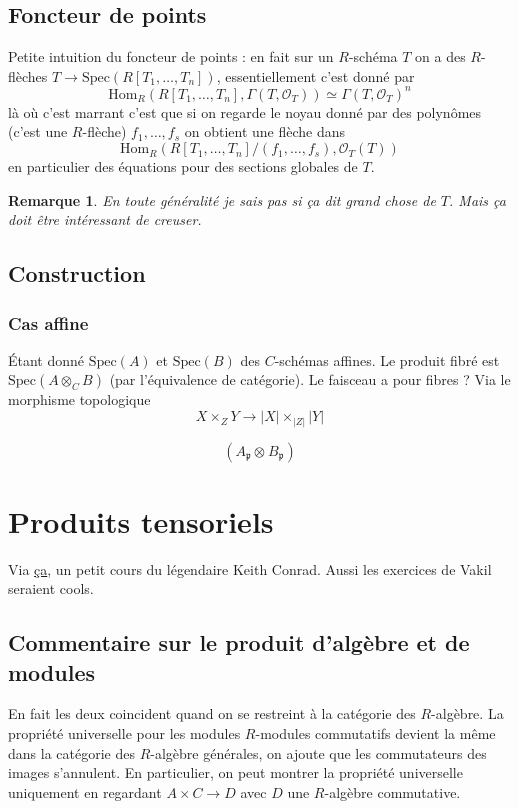\documentclass[a4paper,12pt]{book}
\newcommand{\Or}{\mathcal{O}}
\newcommand{\Hom}{\textrm{Hom}}
\newcommand{\Spec}{\textrm{Spec}}
\newcommand{\p}{\mathfrak{p}}
\newcommand{\q}{\mathfrak{p}}
\theoremstyle{plain}
\newtheorem{rem}{Remarque}
\theoremstyle{definition}
\theoremstyle{remark}
\begin{document}
\section{Foncteur de points}
Petite intuition du foncteur de points : en fait sur un $R$-schéma $T$
on a des $R$-flèches $T\to \Spec(R[T_1,\ldots,T_n])$, essentiellement 
c'est donné par 
\[\Hom_R(R[T_1,\ldots,T_n],\Gamma(T,\Or_T))\simeq \Gamma(T,\Or_T)^n\]
là où c'est marrant c'est que si on regarde le noyau donné par des 
polynômes (c'est une $R$-flèche) $f_1,\ldots, f_s$ on obtient une 
flèche dans 
\[\Hom_R(R[T_1,\ldots, T_n]/(f_1,\ldots, f_s), \Or_T(T))\]
en particulier des équations pour des sections globales de $T$.

\begin{rem}
    En toute généralité je sais pas si ça dit grand chose de $T$. Mais
    ça doit être intéressant de creuser.
\end{rem}


\section{Construction}
\subsection{Cas affine}
Étant donné $\Spec(A)$ et $\Spec(B)$ des $C$-schémas affines. Le 
produit fibré est $\Spec(A\otimes_C B)$ (par l'équivalence de 
catégorie). Le faisceau a pour fibres ? Via le morphisme 
topologique 
\[X\times_Z Y\to |X|\times_{|Z|}|Y|\]

\[(A_\p\otimes_{} B_\q)\]
\subsection{}



\chapter{Produits tensoriels}
Via \href{https://kconrad.math.uconn.edu/blurbs/linmultialg/tensorprod.pdf}{ça}, un petit cours du légendaire Keith Conrad.
Aussi les exercices de Vakil seraient cools. 
\section{Commentaire sur le produit d'algèbre et de modules}
En fait les deux coincident quand on se restreint à la catégorie
des $R$-algèbre. La propriété universelle pour les modules 
$R$-modules commutatifs devient la même dans la catégorie des
$R$-algèbre générales, on ajoute que les commutateurs des images 
s'annulent. En particulier, on peut montrer la propriété 
universelle uniquement en regardant $A\times C\to D$ avec $D$
une $R$-algèbre commutative.
\end{document}
